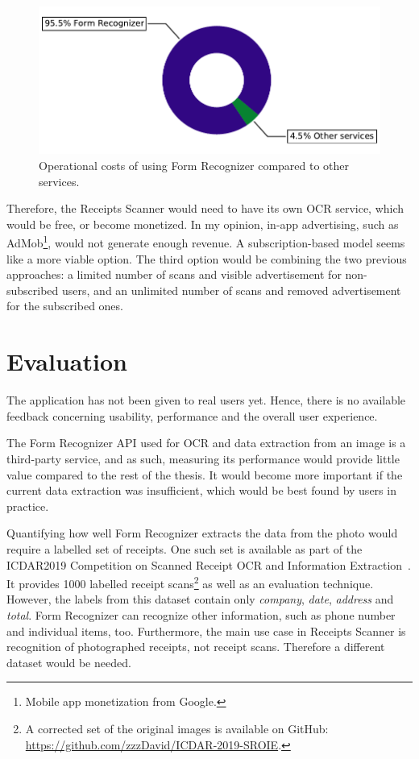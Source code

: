 \documentclass[
  digital, %
  table,   %
  oneside, %
  lof,     %
  lot,     %
]{fithesis3}
\begin{document}
\begin{figure}
    \begin{center}
        \includegraphics[width=1\textwidth]{figures/graphs/operational_costs}
    \end{center}
    \caption{Operational costs of using Form Recognizer compared to other services.}
    \label{fig:operational_costs}
\end{figure}

Therefore, the Receipts Scanner would need to have its own OCR service, which would be free, or become monetized. In my opinion, in-app advertising, such as AdMob\footnote{Mobile app monetization from Google.}, would not generate enough revenue. A subscription-based model seems like a more viable option. The third option would be combining the two previous approaches: a limited number of scans and visible advertisement for non-subscribed users, and an unlimited number of scans and removed advertisement for the subscribed ones.

\chapter{Evaluation}
The application has not been given to real users yet. Hence, there is no available feedback concerning usability, performance and the overall user experience.

The Form Recognizer API used for OCR and data extraction from an image is a third-party service, and as such, measuring its performance would provide little value compared to the rest of the thesis. It would become more important if the current data extraction was insufficient, which would be best found by users in practice.

Quantifying how well Form Recognizer extracts the data from the photo would require a labelled set of receipts. One such set is available as part of the ICDAR2019 Competition on Scanned Receipt OCR
and Information Extraction~\cite{Huang2019ICDAR}. It provides \num{1000} labelled receipt scans\footnote{A corrected set of the original images is available on GitHub: \url{https://github.com/zzzDavid/ICDAR-2019-SROIE}.} as well as an evaluation technique. However, the labels from this dataset contain only \textit{company}, \textit{date}, \textit{address} and \textit{total}. Form Recognizer can recognize other information, such as phone number and individual items, too. Furthermore, the main use case in Receipts Scanner is recognition of photographed receipts, not receipt scans. Therefore a different dataset would be needed.
\end{document}
